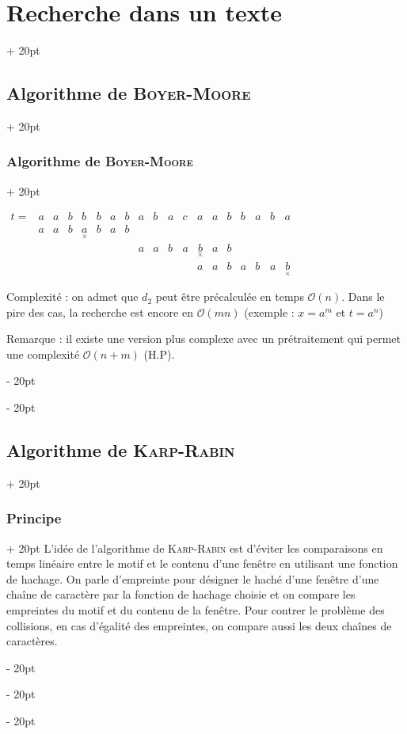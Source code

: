 \documentclass[a4paper, 12pt, twoside]{article}
\newcommand{\ind}[1][20pt]{\advance\leftskip + #1}
\newcommand{\deind}[1][20pt]{\advance\leftskip - #1}
\newenvironment{indt}[2][20pt]{#2 \par \ind[#1]}{\par \deind} %
\begin{document}
\begin{indt}{\section{Recherche dans un texte}}
\begin{indt}{\subsection{Algorithme de \textsc{Boyer-Moore}}}
\begin{indt}{\subsubsection{Algorithme de \textsc{Boyer-Moore}}}
                \vspace{12pt}
                
                $
                    \begin{array}{rcccccccccccccccccc|}
                        t =
                        & a & a & b & b & b & a & b & a & b & a & c & a & a & b & b & a & b & a
                        \\
                        & a & a & b & \underset\times a & b & a & b &&&&&&&&&&&
                        \\
                        & &&&&&&& a & a & b & a & \underset \times b & a & b &&&&
                        \\
                        & &&&&&&&&&& & a & a & b & a & b & a & \underset \times b
                    \end{array}
                $

                \vspace{12pt}
                
                Complexité : on admet que $d_2$ peut être précalculée en temps $\mathcal O(n)$.
                Dans le pire des cas, la recherche est encore en $\mathcal O(mn)$ (exemple : $x = a^m$ et $t = a^n$)

                Remarque : il existe une version plus complexe avec un prétraitement qui permet une complexité $\mathcal O(n + m)$ (H.P).
            \end{indt}
        \end{indt}

        \vspace{12pt}
        
        \begin{indt}{\subsection{Algorithme de \textsc{Karp-Rabin}}}
            \begin{indt}{\subsubsection{Principe}}
                L'idée de l'algorithme de \textsc{Karp-Rabin} est d'éviter les comparaisons en temps linéaire entre le motif et le contenu d'une fenêtre en utilisant une fonction de hachage.
                On parle d'empreinte pour désigner le haché d'une fenêtre d'une chaîne de caractère par la fonction de hachage choisie et on compare les empreintes du motif et du contenu de la fenêtre. Pour contrer le problème des collisions, en cas d'égalité des empreintes, on compare aussi les deux chaînes de caractères.


\end{indt}
\end{indt}
\end{indt}
\end{document}
